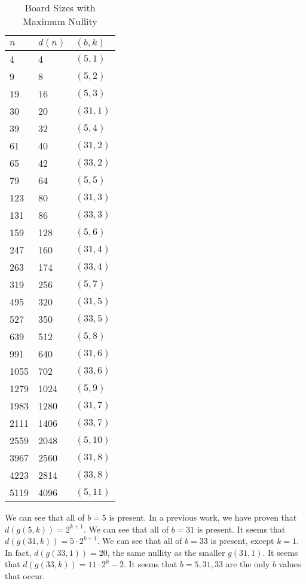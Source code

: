 \documentclass{article}
\begin{document}
	\begin{table}[H]
		\centering
		\begin{tabular}{|l|l|l|}
			\hline
			$n$ & $d(n)$ & $(b,k)$ \\
			\hline\hline
			4 & 4 & $(5,1)$ \\ 
			\hline
			9 & 8 & $(5,2)$ \\
			\hline
			19 & 16 & $(5,3)$ \\
			\hline
			30 & 20 & $(31,1)$ \\
			\hline
			39 & 32 & $(5,4)$ \\
			\hline
			61 & 40 & $(31,2)$ \\
			\hline
			65 & 42 & $(33,2)$ \\
			\hline
			79 & 64 & $(5,5)$ \\
			\hline
			123 & 80 & $(31,3)$ \\
			\hline
			131 & 86 & $(33,3)$ \\
			\hline
			159 & 128 & $(5,6)$ \\
			\hline
			247 & 160 & $(31,4)$ \\
			\hline
			263 & 174 & $(33,4)$ \\
			\hline
			319 & 256 & $(5,7)$ \\
			\hline
			495 & 320 & $(31,5)$ \\
			\hline
			527 & 350 & $(33,5)$ \\
			\hline
			639 & 512 & $(5,8)$ \\
			\hline
			991 & 640 & $(31,6)$ \\
			\hline
			1055 & 702 & $(33,6)$ \\
			\hline
			1279 & 1024 & $(5,9)$ \\
			\hline
			1983 & 1280 & $(31,7)$ \\
			\hline
			2111 & 1406 & $(33,7)$ \\
			\hline
			2559 & 2048 & $(5,10)$ \\
			\hline
			3967 & 2560 & $(31,8)$ \\
			\hline
			4223 & 2814 & $(33,8)$ \\
			\hline
			5119 & 4096 & $(5,11)$ \\
			\hline
		\end{tabular}
		\caption{Board Sizes with Maximum Nullity}
	\end{table}
	We can see that all of $b=5$ is present.
	In a previous work, we have proven that $d(g(5,k)) = 2^{k+1}$.
	We can see that all of $b=31$ is present.
	It seems that $d(g(31,k)) = 5\cdot2^{k+1}$.
	We can see that all of $b=33$ is present, except $k=1$.
	In fact, $d(g(33,1)) = 20$, the same nullity as the smaller $g(31,1)$.
	It seems that $d(g(33,k)) = 11\cdot2^{k} - 2$.
	It seems that $b=5,31,33$ are the only $b$ values that occur.
	
\end{document}

